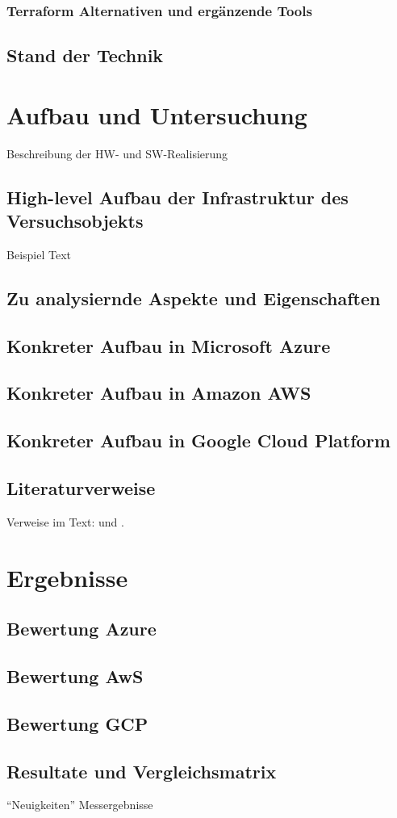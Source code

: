\subsection{Terraform Alternativen und ergänzende Tools}

\section{Stand der Technik}

\chapter{Aufbau und Untersuchung}
\label{sec:real}
Beschreibung der HW- und SW-Realisierung

\section{High-level Aufbau der Infrastruktur des Versuchsobjekts}
\label{sec:real-unter}
Beispiel Text

\section{Zu analysiernde Aspekte und Eigenschaften}

\section{Konkreter Aufbau in Microsoft Azure}

\section{Konkreter Aufbau in Amazon AWS}

\section{Konkreter Aufbau in Google Cloud Platform}

\section{Literaturverweise}
\label{sec:real-literatur}

Verweise im Text: \cite{doc:stz} und \cite{doc:gun}.

\chapter{Ergebnisse}
\label{sec:ergeb}

\section{Bewertung Azure}

\section{Bewertung AwS}

\section{Bewertung GCP}

\section{Resultate und Vergleichsmatrix}

\enquote{Neuigkeiten} Messergebnisse
